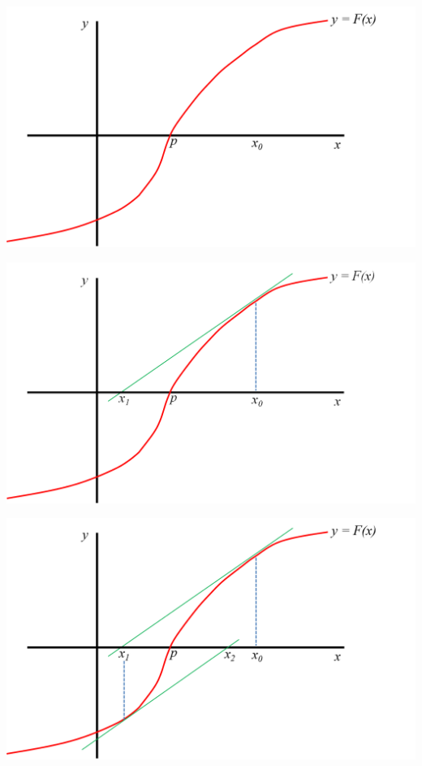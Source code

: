 \documentclass[openany]{book}
\begin{document}
\begin{center}\includegraphics[width=0.9\linewidth]{Plots/U2/nr1} \end{center}

\begin{center}\includegraphics[width=0.9\linewidth]{Plots/U2/nr2} \end{center}

\begin{center}\includegraphics[width=0.9\linewidth]{Plots/U2/nr3} \end{center}
\end{document}
